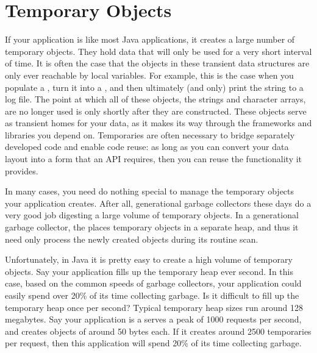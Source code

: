 
\section{Temporary Objects}
\label{temporary-lifetime}

If your application is like most Java applications, it creates a large number of
temporary objects. They hold data that will only be used for a very short
interval of time. It is often the case that the objects in these transient data
structures are only ever reachable by local variables. For example, this is the
case when you populate a , turn it into a , and
then ultimately (and only) print the string to a log file. The point at which all
of these objects, the strings and character arrays, are no longer used is only
shortly after they are constructed. These objects serve as transient homes for
your data, as it makes its way through the frameworks and libraries you depend
on. Temporaries are often necessary to bridge separately developed code and
enable code reuse: as long as you can convert your data layout into a form that
an API requires, then you can reuse the functionality it provides.

In many cases, you need do nothing special to manage the temporary objects your
application creates. After all, generational garbage collectors these days do a
very good job digesting a large volume of temporary objects. In a generational
garbage collector, the \jre places temporary objects in a separate heap, and
thus it need only process the newly created objects during its routine scan.

Unfortunately, in Java it is pretty easy to create a high volume of temporary
objects. Say your application 
fills up the temporary heap ever second. In this case, based on the common
speeds of garbage collectors, your application could easily spend over 20\% of its time
collecting garbage.
Is it difficult to fill up the temporary heap once per second? Typical
temporary heap sizes run around 128 megabytes. Say your application is a serves
a peak of 1000 requests per second, and creates objects of around 50 bytes each.
If it creates around 2500 temporaries per request, then this application will
spend 20\% of its time collecting garbage.


